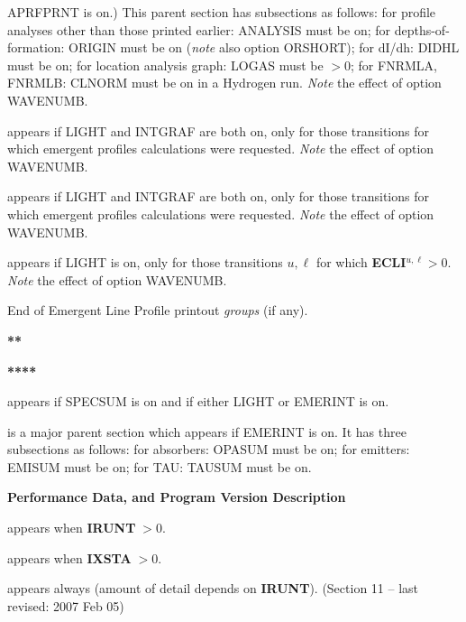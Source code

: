 APRFPRNT is on.) This parent section has subsections as follows:
\bull for profile analyses other than those printed earlier: ANALYSIS
must be on;
\bull for depths-of-formation: ORIGIN must be on ({\it note} also option
ORSHORT);
\bull for dI/dh: DIDHL must be on;
\bull for location analysis graph: LOGAS must be $> 0$;
\bull for FNRMLA, FNRMLB: CLNORM must be on in a Hydrogen run. \np
{\it Note} the effect of option WAVENUMB.
\ej
{} \par
appears if LIGHT and INTGRAF are both on, only for those
transitions for \break which emergent profiles calculations were requested. \np
{\it Note} the effect of option WAVENUMB.
\blankline
{} \par
appears if LIGHT and INTGRAF are both on, only for those
transitions for \break which emergent profiles calculations were requested. \np
{\it Note} the effect of option WAVENUMB.
\blankline
{} \par
appears if LIGHT is on, only for those transitions $u,\ell$ for
which {\bf ECLI}$^{u,\ell} > 0$. \np
{\it Note} the effect of option WAVENUMB.
\blankline
\centerline{ End of Emergent Line Profile printout {\it groups} (if any).}
\blankline
\centerline{\bf*}
\centerline{\bf***}
\centerline{\bf*****}
\blankline
\blankline
{} \par
appears if SPECSUM is on and if either LIGHT or EMERINT
is on.
\blankline
{} \par
is a major parent section which appears if EMERINT is on. It has
three subsections as follows:
\bull for absorbers: OPASUM must be on;
\bull for emitters: EMISUM must be on;
\bull for TAU: TAUSUM must be on.
\ej
\centerline{\bf Performance Data, and Program Version Description}
\blankline
\blankline
\blankline
{} \par
appears when {\bf IRUNT}$\; > 0$.
\blankline
{} \par
appears when {\bf IXSTA}$\; > 0$.
\blankline
{} \par
appears always (amount of detail depends on {\bf IRUNT}).
\blankline
\vfill
\noindent (Section 11 -- last revised: 2007 Feb 05) \par
{}
\ej
